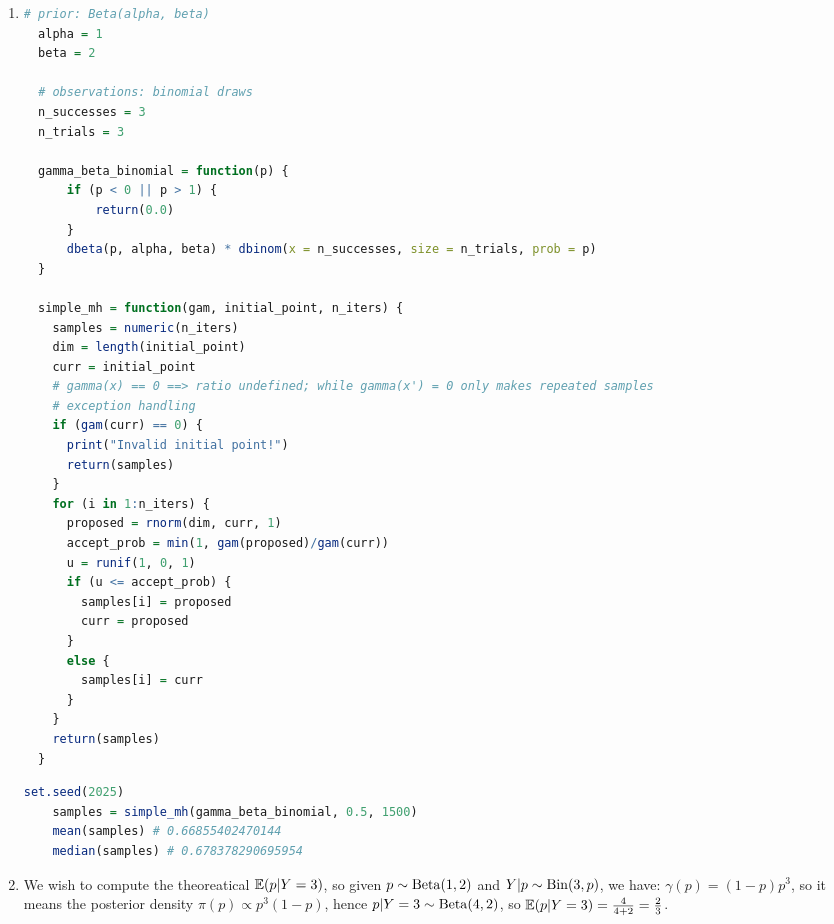 \documentclass{article}
\begin{document}
\begin{enumerate}
\item 
\begin{lstlisting}[language=R]
  # prior: Beta(alpha, beta)
  alpha = 1
  beta = 2 
  
  # observations: binomial draws
  n_successes = 3 
  n_trials = 3
  
  gamma_beta_binomial = function(p) {
      if (p < 0 || p > 1) {
          return(0.0)
      }
      dbeta(p, alpha, beta) * dbinom(x = n_successes, size = n_trials, prob = p)
  }
  
  simple_mh = function(gam, initial_point, n_iters) {
    samples = numeric(n_iters) 
    dim = length(initial_point)
    curr = initial_point
    # gamma(x) == 0 ==> ratio undefined; while gamma(x') = 0 only makes repeated samples
    # exception handling
    if (gam(curr) == 0) {
      print("Invalid initial point!")
      return(samples)
    }
    for (i in 1:n_iters) {
      proposed = rnorm(dim, curr, 1)
      accept_prob = min(1, gam(proposed)/gam(curr))
      u = runif(1, 0, 1)
      if (u <= accept_prob) {
        samples[i] = proposed
        curr = proposed
      }
      else {
        samples[i] = curr
      }
    }
    return(samples)
  }
  \end{lstlisting}
  \begin{lstlisting}[language=R]
    set.seed(2025)
    samples = simple_mh(gamma_beta_binomial, 0.5, 1500)
    mean(samples) # 0.66855402470144
    median(samples) # 0.678378290695954
  \end{lstlisting}


\item 
We wish to compute the theoreatical $\mathbb{E}(p | Y = 3)$, so given $p \sim \operatorname{Beta}(1,2)$ and $Y|p \sim \operatorname{Bin}(3, p)$, we have: $\gamma(p) = (1-p)p^3$, so it means the posterior density $\pi(p) \propto p^3(1-p)$, hence $p|Y=3 \sim \operatorname{Beta}(4,2)$, so $\mathbb{E}(p | Y=3) = \frac{4}{4+2} = \frac23$.


\end{enumerate}





 
\end{document}
